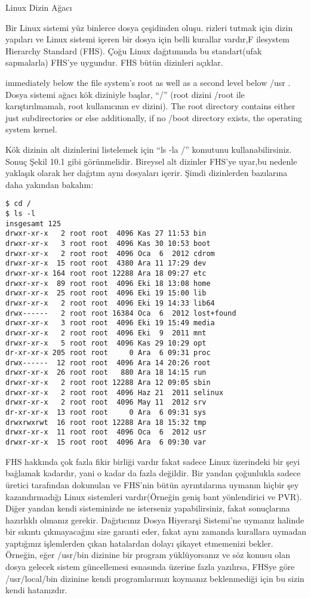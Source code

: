 \begin{section}{Linux Dizin Ağacı}
\label{sec:bolum103}

Bir Linux sistemi yüz binlerce dosya çeşidinden oluşu. rizleri tutmak için dizin yapıları ve Linux sistemi içeren bir dosya için belli kurallar vardır,F ilesystem Hierarchy Standard (FHS). Çoğu Linux dağıtımında bu standart(ufak sapmalarla) FHS'ye uygundur. FHS bütün dizinleri açıklar.

immediately below the file system’s root as well as a second level below /usr .
Dosya sistemi ağacı kök diziniyle başlar, “/” (root dizini /root ile karıştırılmamalı, root kullanıcının ev dizini). The root directory contains either just subdirectories or else additionally, if no /boot directory exists, the operating system kernel. 

Kök dizinin alt dizinlerini listelemek için “ls -la /” komutunu kullanabilirsiniz. Sonuç Şekil 10.1 gibi görünmelidir. Bireysel alt dizinler FHS'ye uyar,bu nedenle yaklaşık olarak her dağıtım aynı dosyaları içerir. Şimdi dizinlerden bazılarına daha yakından bakalım:
\begin{verbatim}
$ cd / 
$ ls -l 
insgesamt 125 
drwxr-xr-x   2 root root  4096 Kas 27 11:53 bin
drwxr-xr-x   3 root root  4096 Kas 30 10:53 boot
drwxr-xr-x   2 root root  4096 Oca  6  2012 cdrom
drwxr-xr-x  15 root root  4380 Ara 11 17:29 dev
drwxr-xr-x 164 root root 12288 Ara 18 09:27 etc
drwxr-xr-x  89 root root  4096 Eki 18 13:08 home
drwxr-xr-x  25 root root  4096 Eki 19 15:00 lib
drwxr-xr-x   2 root root  4096 Eki 19 14:33 lib64
drwx------   2 root root 16384 Oca  6  2012 lost+found
drwxr-xr-x   3 root root  4096 Eki 19 15:49 media
drwxr-xr-x   2 root root  4096 Eki  9  2011 mnt
drwxr-xr-x   5 root root  4096 Kas 29 10:29 opt
dr-xr-xr-x 205 root root     0 Ara  6 09:31 proc
drwx------  12 root root  4096 Ara 14 20:26 root
drwxr-xr-x  26 root root   880 Ara 18 14:15 run
drwxr-xr-x   2 root root 12288 Ara 12 09:05 sbin
drwxr-xr-x   2 root root  4096 Haz 21  2011 selinux
drwxr-xr-x   2 root root  4096 May 11  2012 srv
dr-xr-xr-x  13 root root     0 Ara  6 09:31 sys
drwxrwxrwt  16 root root 12288 Ara 18 15:32 tmp
drwxr-xr-x  11 root root  4096 Oca  6  2012 usr
drwxr-xr-x  15 root root  4096 Ara  6 09:30 var
\end{verbatim}

FHS hakkında çok fazla fikir birliği vardır fakat sadece Linux üzerindeki bir şeyi bağlamak kadardır, yani o kadar da fazla değildir. Bir yandan çoğunlukla sadece üretici tarafından dokunulan ve FHS’nin bütün ayrıntılarına uymanın hiçbir şey kazandırmadığı Linux sistemleri vardır(Örneğin geniş bant yönlendirici ve PVR). Diğer yandan kendi sisteminizde ne isterseniz yapabilirsiniz, fakat sonuçlarına hazırlıklı olmanız gerekir. Dağıtıcınız Dosya Hiyerarşi Sistemi’ne uymanız halinde bir sıkıntı çıkmayacağını size garanti eder, fakat aynı zamanda kurallara uymadan yaptığınız işlemlerden çıkan hatalardan dolayı şikayet etmemenizi bekler. Örneğin, eğer /usr/bin dizinine bir program yüklüyorsanız ve söz konusu olan dosya gelecek sistem güncellemesi esnasında üzerine fazla yazılırsa, FHSye göre /usr/local/bin dizinine kendi programlarınızı koymanız beklenmediği için bu sizin kendi hatanızdır.


\end{section}
